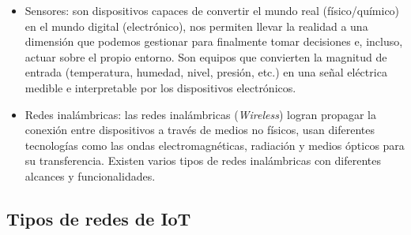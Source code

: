 \begin{itemize}
\item Sensores: son dispositivos capaces de convertir el mundo real (físico/químico) en el mundo digital (electrónico), nos permiten llevar la realidad a una dimensión que podemos gestionar para finalmente tomar decisiones e, incluso, actuar sobre el propio entorno. Son equipos que convierten la magnitud de entrada (temperatura, humedad, nivel, presión, etc.) en una señal eléctrica medible e interpretable por los dispositivos electrónicos.

\item Redes inalámbricas: las redes inalámbricas (\emph{Wireless}) logran propagar la conexión entre dispositivos a través de medios no físicos, usan diferentes tecnologías como las ondas electromagnéticas, radiación y medios ópticos para su transferencia. Existen varios tipos de redes inalámbricas con diferentes alcances y funcionalidades.

\end{itemize}

\subsection{Tipos de redes de IoT}

